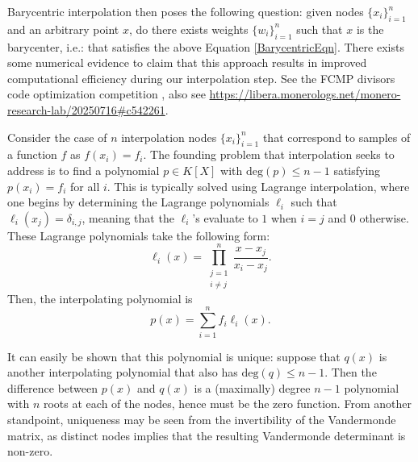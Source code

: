 \documentclass[11pt,letterpaper]{article}
\theoremstyle{definition}
\newcommand{\6}{\mathbf}
\newcommand{\7}{\mathcal}
\begin{document}
Barycentric interpolation then poses the following question: given nodes $\{x_i\}_{i=1}^n$ and an arbitrary point $x$, do there exists weights $\{w_i\}_{i=1}^n$ such that $x$ is the barycenter, i.e.: that satisfies the above Equation \ref{BarycentricEqn}.
There exists some numerical evidence to claim that this approach results in improved computational efficiency during our interpolation step. See the FCMP divisors code optimization competition \cite{monero2025fcmp,Fabrizio}, also see \url{https://libera.monerologs.net/monero-research-lab/20250716#c542261}.



Consider the case of $n$ interpolation nodes $\{x_i\}_{i=1}^n$ that correspond to samples of a function $f$ as $f(x_i) = f_i$.
The founding problem that interpolation seeks to address is to find a polynomial $p \in K[X]$  with $\text{deg}(p) \leq n-1$ satisfying $p(x_i) = f_i$ for all $i$.
This is typically solved using Lagrange interpolation, where one begins by determining the Lagrange polynomials $\ell_i$ such that $\ell_i(x_j) = \delta_{i,j}$, meaning that the $\ell_i$'s evaluate to $1$ when $i=j$ and $0$ otherwise. 
These Lagrange polynomials take the following form: 
$$\ell_i(x) = \prod\limits_{\substack{{j=1} \\ {i \neq j}}}^n \frac{x-x_j}{x_i-x_j}.$$
Then, the interpolating polynomial is
$$p(x) = \sum_{i=1}^n f_i \ell_i(x).$$

It can easily be shown that this polynomial is unique: suppose that $q(x)$ is another interpolating polynomial that also has $\text{deg}(q) \leq n-1$. 
Then the difference between $p(x)$ and $q(x)$ is a (maximally) degree $n-1$ polynomial with $n$ roots at each of the nodes, hence must be the zero function. 
From another standpoint, uniqueness may be seen from the invertibility of the Vandermonde matrix, as distinct nodes implies that the resulting Vandermonde determinant is non-zero.

\end{document}
